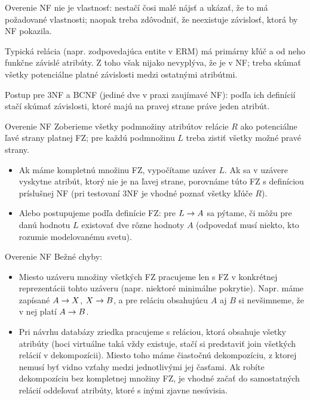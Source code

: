 \documentclass[12pt]{beamer}
\begin{document}
\begin{frame}[fragile]{Overenie NF}
 nie je  vlastnosť:
nestačí čosi malé nájsť a ukázať, že to má požadované vlastnosti;
naopak treba zdôvodniť, že neexistuje závislosť, ktorá by NF pokazila.
\bigskip

Typická relácia (napr. zodpovedajúca entite v ERM)
má primárny kľúč a od neho funkčne závislé atribúty.
Z toho však nijako nevyplýva, že je v NF; treba skúmať všetky potenciálne platné závislosti
medzi ostatnými atribútmi.
\bigskip

Postup pre 3NF a BCNF (jediné dve v praxi zaujímavé NF):
podľa ich definícií stačí skúmať závislosti, ktoré majú na pravej strane práve jeden atribút.
\end{frame}

\begin{frame}[fragile]{Overenie NF}
Zoberieme všetky podmnožiny atribútov relácie $R$ ako potenciálne ľavé strany platnej FZ;
pre každú podmnožinu $L$ treba zistiť všetky možné pravé strany.
\begin{itemize}
\item Ak máme kompletnú množinu FZ, vypočítame uzáver $L$.
Ak sa v uzávere vyskytne atribút, ktorý nie je na ľavej strane, porovnáme túto FZ s definíciou príslušnej NF
(pri testovaní 3NF je vhodné poznať všetky kľúče $R$).

\item Alebo postupujeme podľa definície FZ: pre $L\rightarrow A$ sa pýtame,
či môžu pre danú hodnotu $L$ existovať dve rôzne hodnoty $A$
(odpovedať musí niekto, kto rozumie modelovanému svetu).
\end{itemize}
\end{frame}

\begin{frame}[fragile]{Overenie NF}
Bežné chyby:
\begin{itemize}
\item Miesto uzáveru množiny všetkých FZ pracujeme len s FZ v konkrétnej reprezentácii tohto uzáveru (napr. niektoré minimálne pokrytie).
Napr. máme zapísané $A\rightarrow X$, $X\rightarrow B$, a pre reláciu obsahujúcu $A$ aj $B$ si nevšimneme, že v nej platí $A\rightarrow B$.
\item Pri návrhu databázy zriedka pracujeme s reláciou, ktorá obsahuje všetky atribúty
(hoci virtuálne taká vždy existuje, stačí si predstaviť join všetkých relácií v dekompozícii).
Miesto toho máme čiastočnú dekompozíciu, z ktorej nemusí byť vidno vzťahy medzi jednotlivými jej časťami.
Ak robíte dekompozíciu bez kompletnej množiny FZ, je vhodné začať do samostatných relácií oddeľovať atribúty, ktoré s inými zjavne nesúvisia.
\end{itemize}
\end{frame}
\end{document}
